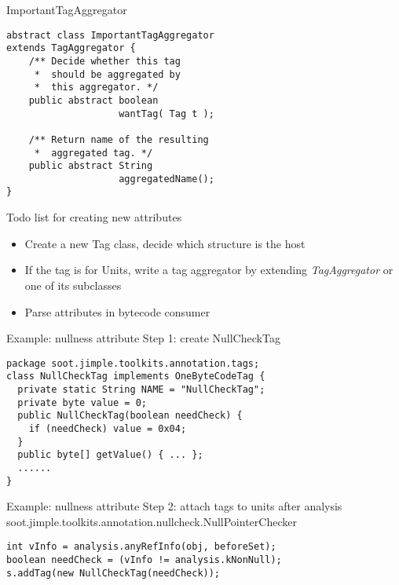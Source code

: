 \begin{slide}{ImportantTagAggregator}
\vspace*{-6mm}
\begin{verbatim}
abstract class ImportantTagAggregator 
extends TagAggregator {    
    /** Decide whether this tag
     *  should be aggregated by
     *  this aggregator. */
    public abstract boolean
                    wantTag( Tag t );

    /** Return name of the resulting
     *  aggregated tag. */
    public abstract String 
                    aggregatedName();
}
\end{verbatim}
\end{slide}

\begin{slide}{Todo list for creating new attributes}
\begin{itemize}
\item Create a new Tag class, decide which structure is the host
\item If the tag is for Units, write a tag aggregator by extending {\em TagAggregator} or one of its subclasses
\item Parse attributes in bytecode consumer
\end{itemize}
\end{slide}

\begin{slide}{Example: nullness attribute}
Step 1: create NullCheckTag
\footnotesize{
\begin{verbatim}
package soot.jimple.toolkits.annotation.tags;
class NullCheckTag implements OneByteCodeTag {
  private static String NAME = "NullCheckTag";
  private byte value = 0;
  public NullCheckTag(boolean needCheck) {
    if (needCheck) value = 0x04;
  }
  public byte[] getValue() { ... };
  ......
}
\end{verbatim}
}
\end{slide}

\begin{slide}{Example: nullness attribute}
Step 2: attach tags to units after analysis \\
{\small soot.jimple.toolkits.annotation.nullcheck.NullPointerChecker}
\footnotesize{
\begin{verbatim}
int vInfo = analysis.anyRefInfo(obj, beforeSet);
boolean needCheck = (vInfo != analysis.kNonNull); 
s.addTag(new NullCheckTag(needCheck));
\end{verbatim}
}
\end{slide}

